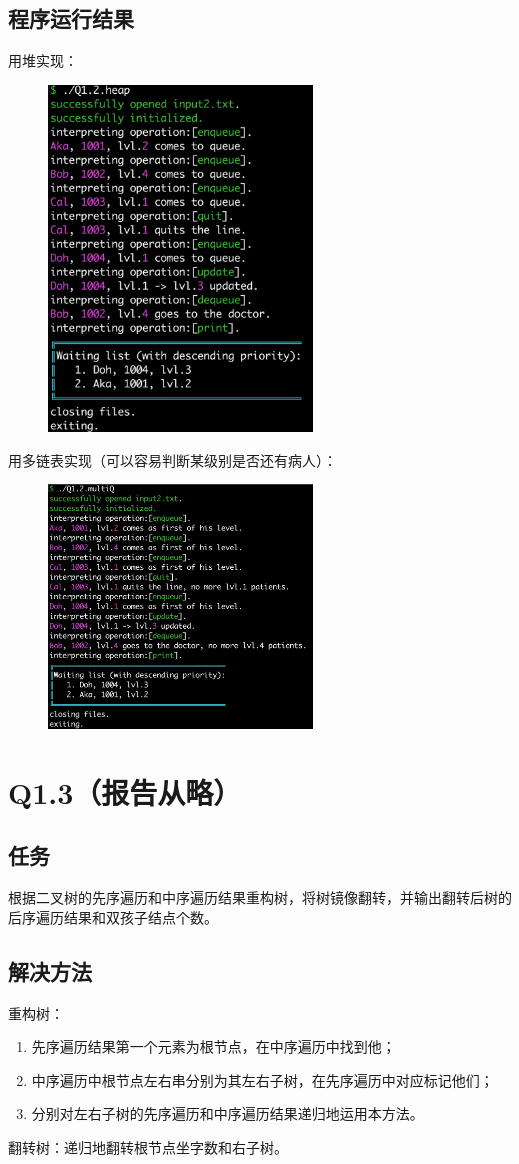 \documentclass{homework}
\begin{document}
\subsection{程序运行结果}
用堆实现：
\begin{figure}[H]
    \centering
    \includegraphics[width=7cm]{Q1.2/Q1.2.heap.png}
\end{figure}
用多链表实现（可以容易判断某级别是否还有病人）：
\begin{figure}[H]
    \centering
    \includegraphics[width=7cm]{Q1.2/Q1.2.multiQ.png}
\end{figure}
\section{Q1.3（报告从略）}
\subsection{任务}
根据二叉树的先序遍历和中序遍历结果重构树，将树镜像翻转，并输出翻转后树的后序遍历结果和双孩子结点个数。
\subsection{解决方法}
重构树：
\begin{enumerate}
    \item 先序遍历结果第一个元素为根节点，在中序遍历中找到他；
    \item 中序遍历中根节点左右串分别为其左右子树，在先序遍历中对应标记他们；
    \item 分别对左右子树的先序遍历和中序遍历结果递归地运用本方法。
\end{enumerate}
翻转树：递归地翻转根节点坐字数和右子树。
\end{document}
